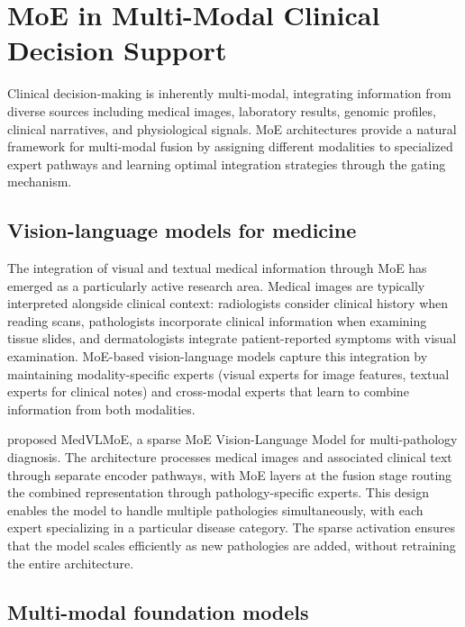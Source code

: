 
\section*{MoE in Multi-Modal Clinical Decision Support}

Clinical decision-making is inherently multi-modal, integrating information from diverse sources including medical images, laboratory results, genomic profiles, clinical narratives, and physiological signals. MoE architectures provide a natural framework for multi-modal fusion by assigning different modalities to specialized expert pathways and learning optimal integration strategies through the gating mechanism.

\subsection*{Vision-language models for medicine}

The integration of visual and textual medical information through MoE has emerged as a particularly active research area. Medical images are typically interpreted alongside clinical context: radiologists consider clinical history when reading scans, pathologists incorporate clinical information when examining tissue slides, and dermatologists integrate patient-reported symptoms with visual examination. MoE-based vision-language models capture this integration by maintaining modality-specific experts (visual experts for image features, textual experts for clinical notes) and cross-modal experts that learn to combine information from both modalities.

\cite{khan2025medvlmoe} proposed MedVLMoE, a sparse MoE Vision-Language Model for multi-pathology diagnosis. The architecture processes medical images and associated clinical text through separate encoder pathways, with MoE layers at the fusion stage routing the combined representation through pathology-specific experts. This design enables the model to handle multiple pathologies simultaneously, with each expert specializing in a particular disease category. The sparse activation ensures that the model scales efficiently as new pathologies are added, without retraining the entire architecture.

\subsection*{Multi-modal foundation models}

